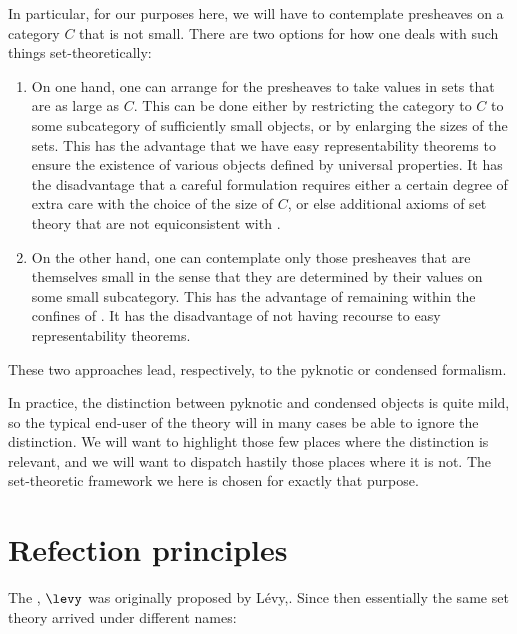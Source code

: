 In particular, for our purposes here,
we will have to contemplate presheaves on a category $C$ that is not small.
There are two options for how one deals with such things set-theoretically:
\begin{enumerate}
	\item On one hand, one can arrange for the presheaves to take values in sets that are as large as $C$.
		This can be done either by restricting the category to $C$ to some subcategory of sufficiently small objects,
		or by enlarging the sizes of the sets.
		This has the advantage that we have easy representability theorems to ensure the existence of various objects defined by universal properties.
		It has the disadvantage that a careful formulation requires either a certain degree of extra care with the choice of the size of $C$,
		or else additional axioms of set theory that are not equiconsistent with \zfc.
	\item On the other hand, one can contemplate only those presheaves that are themselves small in the sense that they are determined by their values on some small subcategory.
		This has the advantage of remaining within the confines of \zfc.
		It has the disadvantage of not having recourse to easy representability theorems.
\end{enumerate}
These two approaches lead, respectively, to the pyknotic or condensed formalism.

In practice, the distinction between pyknotic and condensed objects is quite mild,
so the typical end-user of the theory will in many cases be able to ignore the distinction.
We will want to highlight those few places where the distinction is relevant,
and we will want to dispatch hastily those places where it is not.
The set-theoretic framework we  here is chosen for exactly that purpose.

\section{Refection principles}%
\label{sec:reflection_principles}

The , $\levy$ was originally proposed by Lévy,\cite{Levy:1960wx}.
Since then essentially the same set theory arrived under different names:

